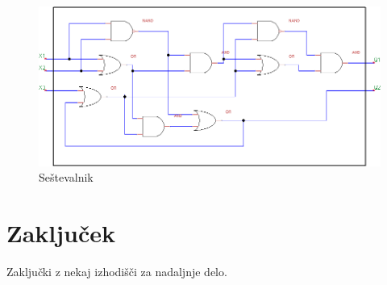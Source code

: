 \documentclass[seminar, slovene]{FRIreport}
\begin{document}
\begin{figure}[h!]
\includegraphics[width=14cm]{vezja/img/adder}
\caption{Seštevalnik}
\label{sestevalnik}
\end{figure}

%
\section{Zaključek}
Zaključki z nekaj izhodišči za nadaljnje delo.

%
\References


\end{document}
